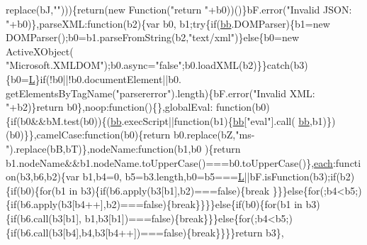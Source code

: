 \begin{DoxyCode}
      replace(bJ,\textcolor{stringliteral}{""})))\{\textcolor{keywordflow}{return}(\textcolor{keyword}{new} Function(\textcolor{stringliteral}{"return "}+b0))()\}bF.error(\textcolor{stringliteral}{"Invalid JSON: "}+b0)\},parseXML:\textcolor{keyword}{function}(b2)\{var b0,
      b1;\textcolor{keywordflow}{try}\{\textcolor{keywordflow}{if}(\hyperlink{jquery_8js_a1d6558865876e1c8cca029fce41a4bdb}{bb}.DOMParser)\{b1=\textcolor{keyword}{new} DOMParser();b0=b1.parseFromString(b2,\textcolor{stringliteral}{"text/xml"})\}\textcolor{keywordflow}{else}\{b0=\textcolor{keyword}{new} ActiveXObject(\textcolor{stringliteral}{
      "Microsoft.XMLDOM"});b0.async=\textcolor{stringliteral}{"false"};b0.loadXML(b2)\}\}\textcolor{keywordflow}{catch}(b3)\{b0=\hyperlink{jquery_8js_a38ee4c0b5f4fe2a18d0c783af540d253}{L}\}\textcolor{keywordflow}{if}(!b0||!b0.documentElement||b0.
      getElementsByTagName(\textcolor{stringliteral}{"parsererror"}).length)\{bF.error(\textcolor{stringliteral}{"Invalid XML: "}+b2)\}\textcolor{keywordflow}{return} b0\},noop:\textcolor{keyword}{function}()\{\},globalEval:\textcolor{keyword}{
      function}(b0)\{\textcolor{keywordflow}{if}(b0&&bM.test(b0))\{(\hyperlink{jquery_8js_a1d6558865876e1c8cca029fce41a4bdb}{bb}.execScript||\textcolor{keyword}{function}(b1)\{\hyperlink{jquery_8js_a1d6558865876e1c8cca029fce41a4bdb}{bb}[\textcolor{stringliteral}{"eval"}].call(
      \hyperlink{jquery_8js_a1d6558865876e1c8cca029fce41a4bdb}{bb},b1)\})(b0)\}\},camelCase:\textcolor{keyword}{function}(b0)\{\textcolor{keywordflow}{return} b0.replace(bZ,\textcolor{stringliteral}{"ms-"}).replace(bB,bT)\},nodeName:\textcolor{keyword}{function}(b1,b0
      )\{\textcolor{keywordflow}{return} b1.nodeName&&b1.nodeName.toUpperCase()===b0.toUpperCase()\},\hyperlink{jquery_8js_a871ff39db627c54c710a3e9909b8234c}{each}:\textcolor{keyword}{function}(b3,b6,b2)\{var b1,b4=0,
      b5=b3.length,b0=b5===\hyperlink{jquery_8js_a38ee4c0b5f4fe2a18d0c783af540d253}{L}||bF.isFunction(b3);\textcolor{keywordflow}{if}(b2)\{\textcolor{keywordflow}{if}(b0)\{\textcolor{keywordflow}{for}(b1 in b3)\{\textcolor{keywordflow}{if}(b6.apply(b3[b1],b2)===\textcolor{keyword}{false})\{\textcolor{keywordflow}{break}
      \}\}\}\textcolor{keywordflow}{else}\{\textcolor{keywordflow}{for}(;b4<b5;)\{\textcolor{keywordflow}{if}(b6.apply(b3[b4++],b2)===\textcolor{keyword}{false})\{\textcolor{keywordflow}{break}\}\}\}\}\textcolor{keywordflow}{else}\{\textcolor{keywordflow}{if}(b0)\{\textcolor{keywordflow}{for}(b1 in b3)\{\textcolor{keywordflow}{if}(b6.call(b3[b1],
      b1,b3[b1])===\textcolor{keyword}{false})\{\textcolor{keywordflow}{break}\}\}\}\textcolor{keywordflow}{else}\{\textcolor{keywordflow}{for}(;b4<b5;)\{\textcolor{keywordflow}{if}(b6.call(b3[b4],b4,b3[b4++])===\textcolor{keyword}{false})\{\textcolor{keywordflow}{break}\}\}\}\}\textcolor{keywordflow}{return} b3\},

\end{DoxyCode}
